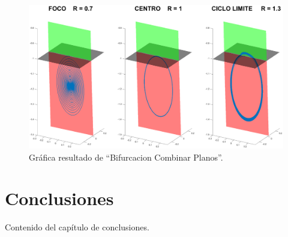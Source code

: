 \documentclass[12pt,a4paper]{report} %
\begin{document}
	\vspace{0.5cm}
	
	\newpage
	
	\vspace{0.5cm}
	
	\newpage
	
	\begin{figure}[h]
		\centering
		\includegraphics[width=1.3\textwidth,center]{3planoscircuito.eps}
		\caption{Gráfica resultado de ``Bifurcacion Combinar Planos''.}
		\label{fig:3planoscircuito}
	\end{figure}\smallskip
	
	\newpage
	
	\chapter*{Conclusiones}
	Contenido del capítulo de conclusiones.
	
	\newpage
	
\end{document}
